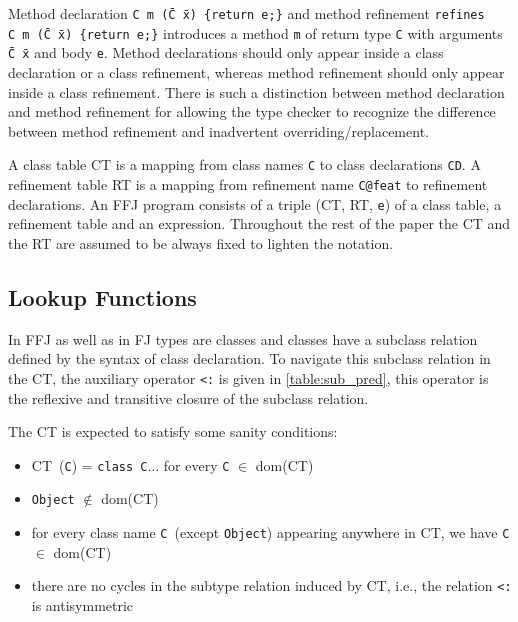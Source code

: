 Method declaration \texttt{C~m~(\={C}~\={x})\ \{return~e;\}} and method refinement \texttt{refines C~m~(\={C}~\={x})\ \{return~e;\}} 
introduces a method \texttt{m} of return type \texttt{C} with arguments \texttt{\={C}~\={x}} and body \texttt{e}.
Method declarations should only appear inside a class declaration or a class refinement, whereas method refinement should only appear
inside a class refinement. There is such a distinction between method declaration and method refinement for allowing the type checker
to recognize the difference between method refinement and inadvertent overriding/replacement.

A class table \textsf{CT} is a mapping from class names \texttt{C} to class declarations \texttt{CD}.
A refinement table \textsf{RT} is a mapping from refinement name \texttt{C@feat} to refinement declarations.
An \ac{FFJ} program consists of a triple (\textsf{CT}, \textsf{RT}, \texttt{e}) of a class table, a refinement table
and an expression. Throughout the rest of the paper the \textsf{CT} and the RT are assumed to be always fixed to lighten the notation.

\subsection{Lookup Functions}\label{subsec:lookup}

In \ac{FFJ} as well as in \ac{FJ} types are classes and classes have a subclass relation defined by the syntax of class declaration.
To navigate this subclass relation in the \textsf{CT}, the auxiliary operator \texttt{<:} is given in \ref{table:sub_pred}, this operator is 
the reflexive and transitive closure of the subclass relation.

The \textsf{CT} is expected to satisfy some sanity conditions:
\begin{itemize}
	\item  \textsf{CT}~(\texttt{C}) = \texttt{class C}$\ldots$ for every \texttt{C} $\in$ dom(\textsf{CT})
	\item \texttt{Object} $\notin$ dom(\textsf{CT})
	\item for every class name \texttt{C}~(except \texttt{Object}) appearing anywhere
		in \textsf{CT}, we have \texttt{C} $\in$ dom(\textsf{CT})
	\item there are no cycles in the subtype relation induced by \textsf{CT}, i.e., the
		relation \texttt{<:} is antisymmetric
\end{itemize}

